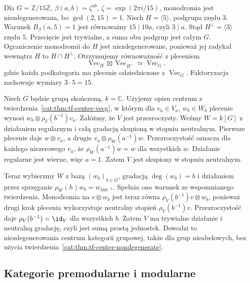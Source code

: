 \begin{przyklad}\label{cat:ex:tf-cyclic-factorization}
Dla $G=\mathbb Z/15\mathbb Z$, $\beta(a,b)=\zeta^{ab}$, $\zeta=\exp(2\pi i/15)$, monodromia jest niezdegenerowana, bo $\gcd(2,15)=1$. Niech $H=\langle5\rangle$, podgrupa rzędu $3$. Warunek $B_\beta(a,5)=1$ jest równoważny $15\mid 10a$, czyli $3\mid a$. Stąd $H^\perp=\langle3\rangle$ rzędu $5$. Przecięcie jest trywialne, a suma obu podgrup jest całym $G$. Ograniczenie monodromii do $H$ jest niezdegenerowane, ponieważ jej radykał wewnątrz $H$ to $H\cap H^\perp$. Otrzymujemy równoważność z pleceniem
\[
 \operatorname{Vec}_H\boxtimes\operatorname{Vec}_{H^\perp}
 \simeq\operatorname{Vec}_G,
\]
gdzie każda podkategoria ma plecenie odziedziczone z $\operatorname{Vec}_G$. Faktoryzacja zachowuje wymiary $3\cdot5=15$.
\end{przyklad}

\begin{przyklad}\label{cat:ex:tf-center-group-nondegenerate}
Niech $G$ będzie grupą skończoną, $k=\mathbb C$. Użyjemy opisu centrum z twierdzenia~\ref{cat:thm:tf-center-vecg}, w którym dla $v_a\in V_a$, $w_b\in W_b$ plecenie wynosi $w_b\otimes\rho_V(b^{-1})v_a$. Załóżmy, że $V$ jest przezroczysty. Weźmy $W=k[G]$ z działaniem regularnym i całą gradacją skupioną w stopniu neutralnym. Pierwsze plecenie daje $w\otimes v_a$, a drugie $v_a\otimes\rho_W(a^{-1})w$. Przezroczystość oznacza dla każdego niezerowego $v_a$, że $\rho_W(a^{-1})w=w$ dla wszystkich $w$. Działanie regularne jest wierne, więc $a=1$. Zatem $V$ jest skupiony w stopniu neutralnym.

Teraz wybierzmy $W$ z bazą $(w_b)_{b\in G}$, gradacją $\deg(w_b)=b$ i działaniem przez sprzęganie $\rho_W(h)w_b=w_{hbh^{-1}}$. Spełnia ono warunek ze wspomnianego twierdzenia. Monodromia na $v\otimes w_b$ jest teraz równa $\rho_V(b^{-1})v\otimes w_b$, ponieważ drugi krok plecenia wykorzystuje neutralny stopień $\rho_V(b^{-1})v$. Przezroczystość daje $\rho_V(b^{-1})=\id_V$ dla wszystkich $b$. Zatem $V$ ma trywialne działanie i neutralną gradację, czyli jest sumą prostą jednostek. Dowodzi to niezdegenerowania centrum kategorii grupowej, także dla grup nieabelowych, bez użycia twierdzenia~\ref{cat:thm:tf-center-nondegenerate}.
\end{przyklad}

\subsection{Kategorie premodularne i modularne}

